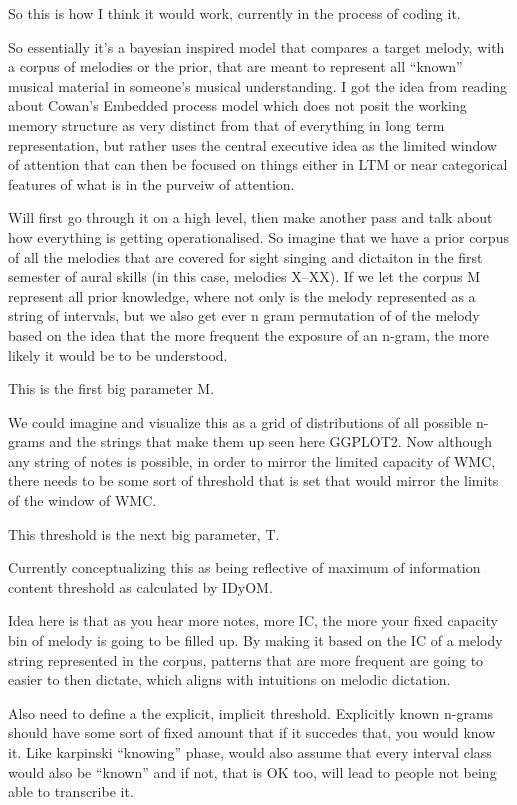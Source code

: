 \documentclass[]{book}
\theoremstyle{definition}
\theoremstyle{definition}
\theoremstyle{definition}
\theoremstyle{remark}
\begin{document}
So this is how I think it would work, currently in the process of coding
it.

So essentially it's a bayesian inspired model that compares a target
melody, with a corpus of melodies or the prior, that are meant to
represent all ``known'' musical material in someone's musical
understanding. I got the idea from reading about Cowan's Embedded
process model which does not posit the working memory structure as very
distinct from that of everything in long term representation, but rather
uses the central executive idea as the limited window of attention that
can then be focused on things either in LTM or near categorical features
of what is in the purveiw of attention.

Will first go through it on a high level, then make another pass and
talk about how everything is getting operationalised. So imagine that we
have a prior corpus of all the melodies that are covered for sight
singing and dictaiton in the first semester of aural skills (in this
case, melodies X--XX). If we let the corpus M represent all prior
knowledge, where not only is the melody represented as a string of
intervals, but we also get ever n gram permutation of of the melody
based on the idea that the more frequent the exposure of an n-gram, the
more likely it would be to be understood.

This is the first big parameter M.

We could imagine and visualize this as a grid of distributions of all
possible n-grams and the strings that make them up seen here GGPLOT2.
Now although any string of notes is possible, in order to mirror the
limited capacity of WMC, there needs to be some sort of threshold that
is set that would mirror the limits of the window of WMC.

This threshold is the next big parameter, T.

Currently conceptualizing this as being reflective of maximum of
information content threshold as calculated by IDyOM.

Idea here is that as you hear more notes, more IC, the more your fixed
capacity bin of melody is going to be filled up. By making it based on
the IC of a melody string represented in the corpus, patterns that are
more frequent are going to easier to then dictate, which aligns with
intuitions on melodic dictation.

Also need to define a the explicit, implicit threshold. Explicitly known
n-grams should have some sort of fixed amount that if it succedes that,
you would know it. Like karpinski ``knowing'' phase, would also assume
that every interval class would also be ``known'' and if not, that is OK
too, will lead to people not being able to transcribe it.
\end{document}
